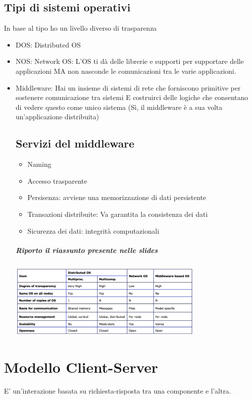 \documentclass[12pt, a4paper, openany, twoside]{book}
\begin{document}
\section{Tipi di sistemi operativi}
In base al tipo ho un livello diverso di trasparenza
\begin{itemize}
	\item DOS: Distributed OS
	\item NOS: Network OS: L'OS ti dà delle librerie e supporti per supportare
	delle applicazioni MA non nasconde le comunicazioni tra le varie applicazioni.
	\item Middleware: Hai un insieme di sistemi di rete che forniscono primitive
	per sostenere comunicazione tra sistemi E costruirci delle logiche che 
	consentano di vedere questo come unico sistema (Sì, il middleware è 
	a sua volta un'applicazione distribuita)
	\section{Servizi del middleware}
	\begin{itemize}
		\item Naming
		\item Accesso trasparente
		\item Persisenza: avviene una memorizzazione di dati persistente
		\item Transazioni distribuite: Va garantita la consistenza dei dati
		\item Sicurezza dei dati: integrità computazionali
	\end{itemize}
	\paragraph{Riporto il riassunto presente nelle slides}  
	\begin{center}
	\includegraphics[width=0.75\textwidth]{1.png}
	\end{center}
\end{itemize}
\chapter{Modello Client-Server}
E' un'interazione basata su richiesta-risposta tra una componente e 
l'altra.
\end{document}
